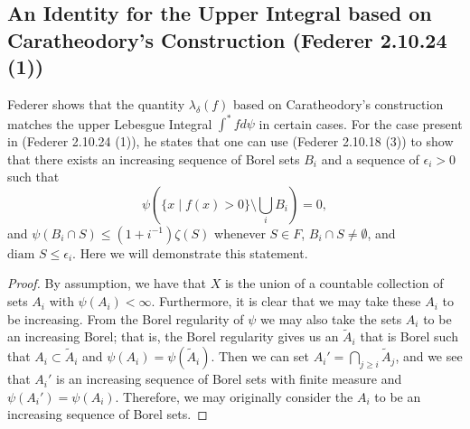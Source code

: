 \subsection{An Identity for the Upper Integral based on Caratheodory's Construction (Federer 2.10.24 (1))} 
Federer shows that the quantity \(\lambda_\delta(f)\) based on Caratheodory's construction matches the upper
Lebesgue Integral \(\int^* f d\psi\) in certain cases. For the case  present in (Federer 2.10.24 (1)), he
states that one can use (Federer 2.10.18 (3)) to show that there exists an increasing sequence of
Borel sets \(B_i\) and a sequence of \(\epsilon_i > 0\) such that
\begin{equation}
\psi\left(\{x \mid f(x) > 0 \} \setminus \bigcup_i B_i \right) = 0,
\end{equation}
and \(\psi(B_i \cap S) \leq (1 + i^{-1}) \zeta(S)\) whenever \(S \in F\), \(B_i \cap S \neq \emptyset\),
and \(\text{diam }S \leq \epsilon_i\). Here we will demonstrate this statement.

\begin{proof}
By assumption, we have that \(X\) is the union of a countable collection of sets \(A_i\) with
\(\psi(A_i) < \infty\). Furthermore, it is clear that we may take these \(A_i\) to be increasing.
From the Borel regularity of \(\psi\) we may also take the sets \(A_i\) to be an increasing Borel; that is,
the Borel regularity gives us an \(\tilde A_i\) that is Borel such that \(A_i \subset \tilde A_i\) and
\(\psi(A_i) = \psi(\tilde A_i)\). Then we can set \(A_i'  = \bigcap\limits_{j \geq i} \tilde A_j\), and we
see that \(A_i'\) is an increasing sequence of Borel sets with finite measure and \(\psi(A_i') = \psi(A_i)\). 
Therefore, we may originally consider the \(A_i\) to be an increasing sequence of Borel sets.
\end{proof}
